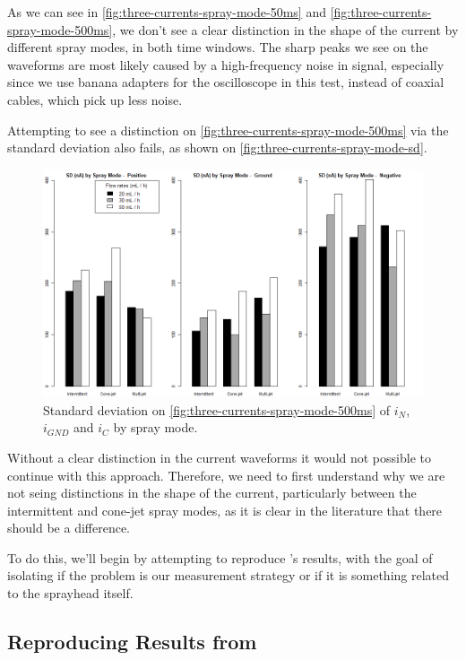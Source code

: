 \documentclass[oneside,12pt]{article}
\begin{document}
As we can see in \autoref{fig:three-currents-spray-mode-50ms} and \autoref{fig:three-currents-spray-mode-500ms}, 
we don't see a clear distinction in the shape of the current 
by different spray modes, in both time windows. The sharp peaks we see on the waveforms are most likely caused
by a high-frequency noise in signal, especially since we use banana adapters for the oscilloscope in this test, instead
of coaxial cables, which pick up less noise.

Attempting to see a distinction on \autoref{fig:three-currents-spray-mode-500ms} via the standard deviation also
fails, as shown on \autoref{fig:three-currents-spray-mode-sd}.

\begin{figure}[h!]
    \centering
    \includegraphics[width=1\textwidth,trim=1 1 1 1,clip]{figures/three-currents-spray-mode-sd.png}
    \caption{Standard deviation on \autoref{fig:three-currents-spray-mode-500ms} of $i_N$, $i_{GND}$ and $i_C$
    by spray mode.}
    \label{fig:three-currents-spray-mode-sd}
\end{figure}

Without a clear distinction in the current waveforms it would not possible to continue with this approach.
Therefore, we need to first understand why we are not seing distinctions in the shape 
of the current, particularly between the intermittent and cone-jet spray modes, as it is clear in the 
literature that there should be a difference.

To do this, we'll begin by attempting to reproduce \cite{Verdoold2013}'s results, with the goal of isolating 
if the problem is our measurement strategy or if it is something related to the sprayhead itself.

\subsection{Reproducing Results from \cite{Verdoold2013}}
\end{document}

